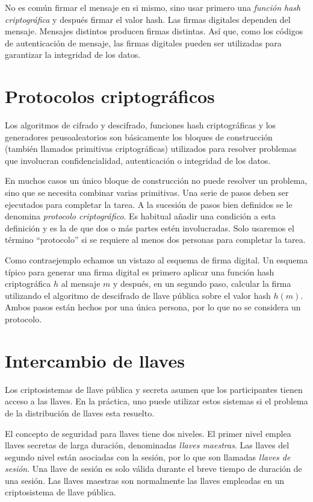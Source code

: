 \documentclass[12pt]{book}
\theoremstyle{definition}
\begin{document}
No es común firmar el mensaje en si mismo, sino usar primero una \textit{función hash criptográfica} y después firmar el valor hash. Las firmas digitales dependen del mensaje. Mensajes distintos producen firmas distintas. Así que, como los códigos de autenticación de mensaje, las firmas digitales pueden ser utilizadas para garantizar la integridad de los datos.


\section{Protocolos criptográficos}

Los algoritmos de cifrado y descifrado, funciones hash criptográficas y los generadores peusoaleatorios son básicamente los bloques de construcción (también llamados primitivas criptográficas) utilizados para resolver problemas que involucran confidencialidad, autenticación o integridad de los datos.

En muchos casos un único bloque de construcción no puede resolver un problema, sino que se necesita combinar varias primitivas. Una serie de pasos deben ser ejecutados para completar la tarea. A la sucesión de pasos bien definidos se le denomina \textit{protocolo criptográfico}. Es habitual añadir una condición a esta definición y es la de que dos o más partes estén involucradas. Solo usaremos el término ``protocolo'' si se requiere al menos dos personas para completar la tarea.

Como contraejemplo echamos un vistazo al esquema de firma digital. Un esquema típico para generar una firma digital es primero aplicar una función hash criptográfica $h$ al mensaje $m$ y después, en un segundo paso, calcular la firma utilizando el algoritmo de descifrado de llave pública sobre el valor hash $h(m)$. Ambos pasos están hechos por una única persona, por lo que no se considera un protocolo.

\section{Intercambio de llaves}
Los criptosistemas de llave pública y secreta asumen que los participantes tienen acceso a las llaves. En la práctica, uno puede utilizar estos sistemas si el problema de la distribución de llaves esta resuelto.

El concepto de seguridad para llaves tiene dos niveles. El primer nivel emplea llaves secretas de larga duración, denominadas \textit{llaves maestras}. Las llaves del segundo nivel están asociadas con la sesión, por lo que son llamadas \textit{llaves de sesión}. Una llave de sesión es solo válida durante el breve tiempo de duración de una sesión. Las llaves maestras son normalmente las llaves empleadas en un criptosistema de llave pública.
\end{document}
